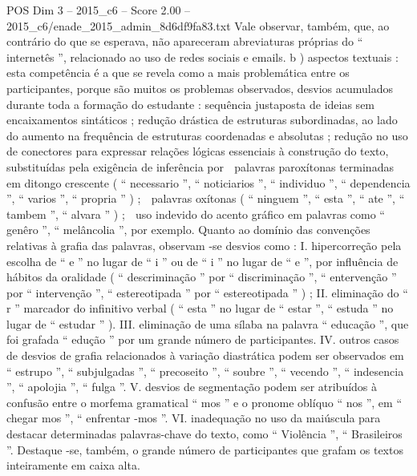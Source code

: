 \begin{textsample}{POS Dim 3 – 2015\_c6 – Score 2.00 – 2015\_c6/enade\_2015\_admin\_8d6df9fa83.txt}
Vale observar, também, que, ao contrário do que se esperava, não apareceram abreviaturas próprias do “ internetês ”, relacionado ao uso de redes sociais e emails. b ) aspectos textuais : esta competência é a que se revela como a mais problemática entre os participantes, porque são muitos os problemas observados, desvios acumulados durante toda a formação do estudante : sequência justaposta de ideias sem encaixamentos sintáticos ; redução drástica de estruturas subordinadas, ao lado do aumento na frequência de estruturas coordenadas e absolutas ; redução no uso de conectores para expressar relações lógicas essenciais à construção do texto, substituídas pela exigência de inferência por  palavras paroxítonas terminadas em ditongo crescente ( “ necessario ”, “ noticiarios ”, “ individuo ”, “ dependencia ”, “ varios ”, “ propria ” ) ;  palavras oxítonas ( “ ninguem ”, “ esta ”, “ ate ”, “ tambem ”, “ alvara ” ) ;  uso indevido do acento gráfico em palavras como “ genêro ”, “ melâncolia ”, por exemplo.
Quanto ao domínio das convenções relativas à grafia das palavras, observam -se desvios como : I. hipercorreção pela escolha de “ e ” no lugar de “ i ” ou de “ i ” no lugar de “ e ”, por influência de hábitos da oralidade ( “ descriminação ” por “ discriminação ”, “ entervenção ” por “ intervenção ”, “ estereotipada ” por “ estereotipada ” ) ; II. eliminação do “ r ” marcador do infinitivo verbal ( “ esta ” no lugar de “ estar ”, “ estuda ” no lugar de “ estudar ” ).
III. eliminação de uma sílaba na palavra “ educação ”, que foi grafada “ edução ” por um grande número de participantes.
IV. outros casos de desvios de grafia relacionados à variação diastrática podem ser observados em “ estrupo ”, “ subjulgadas ”, “ precoseito ”, “ soubre ”, “ vecendo ”, “ indesencia ”, “ apolojia ”, “ fulga ”.
V. desvios de segmentação podem ser atribuídos à confusão entre o morfema gramatical “ mos ” e o pronome oblíquo “ nos ”, em “ chegar mos ”, “ enfrentar -mos ”.
VI. inadequação no uso da maiúscula para destacar determinadas palavras-chave do texto, como “ Violência ”, “ Brasileiros ”.
Destaque -se, também, o grande número de participantes que grafam os textos inteiramente em caixa alta.

\end{textsample}
